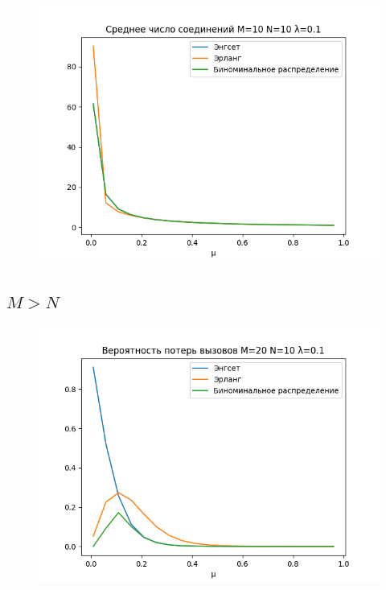 \documentclass[12pt]{article}
\let\Oldsubsection\subsection
\renewcommand{\subsection}{\FloatBarrier\Oldsubsection}
\begin{document}
\begin{figure}[!htb]
\centering
\includegraphics[scale=1.00]{assets/iss_2/aver_conn_M10_N10_lam01.png}
\caption{}
\label{}
\end{figure}

\subsection{$M > N$}\label{subsec2:}
\begin{figure}[!htb]
\centering
\includegraphics[scale=1.00]{assets/iss_2/loss_prob_M20_N10_lam01.png}
\caption{}
\label{}
\end{figure}
\end{document}
